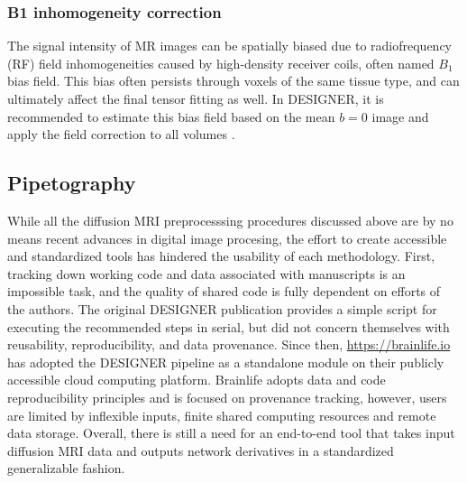 \subsubsection{B1 inhomogeneity correction}
The signal intensity of MR images can be spatially biased due to radiofrequency (RF) field inhomogeneities caused by high-density receiver coils, often named $B_1$ bias field. This bias often persists through voxels of the same tissue type, and can ultimately affect the final tensor fitting as well. In DESIGNER, it is recommended to estimate this bias field based on the mean $b=0$ image and apply the field correction to all volumes \cite{zhang_segmentation_2001,smith_advances_2004,tustison_n4itk_2010}.

\subsection{Pipetography}
While all the diffusion MRI preprocesssing procedures discussed above are by no means recent advances in digital image procesing, the effort to create accessible and standardized tools has hindered the usability of each methodology. First, tracking down working code and data associated with manuscripts is an impossible task, and the quality of shared code is fully dependent on efforts of the authors. The original DESIGNER publication \cite{ades-aron_evaluation_2018} provides a simple script for executing the recommended steps in serial, but did not concern themselves with reusability, reproducibility, and data provenance. Since then, \url{https://brainlife.io} has adopted the DESIGNER pipeline as a standalone module on their publicly accessible cloud computing platform. Brainlife adopts data and code reproducibility principles and is focused on provenance tracking, however, users are limited by inflexible inputs, finite shared computing resources and remote data storage. Overall, there is still a need for an end-to-end tool that takes input diffusion MRI data and outputs network derivatives in a standardized generalizable fashion.

